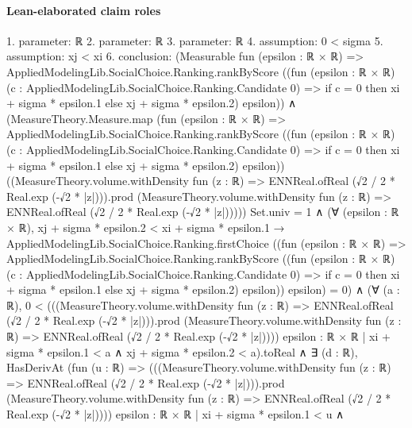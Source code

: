 \documentclass[10pt]{article}
\begin{document}
\paragraph{Lean-elaborated claim roles}\begin{ReviewVerbatim}
1. parameter: ℝ
2. parameter: ℝ
3. parameter: ℝ
4. assumption: 0 < sigma
5. assumption: xj < xi
6. conclusion: (Measurable fun (epsilon : ℝ × ℝ) =>
    AppliedModelingLib.SocialChoice.Ranking.rankByScore
      ((fun (epsilon : ℝ × ℝ) (c : AppliedModelingLib.SocialChoice.Ranking.Candidate 0) =>
          if c = 0 then xi + sigma * epsilon.1 else xj + sigma * epsilon.2)
        epsilon)) ∧
  (MeasureTheory.Measure.map
          (fun (epsilon : ℝ × ℝ) =>
            AppliedModelingLib.SocialChoice.Ranking.rankByScore
              ((fun (epsilon : ℝ × ℝ) (c : AppliedModelingLib.SocialChoice.Ranking.Candidate 0) =>
                  if c = 0 then xi + sigma * epsilon.1 else xj + sigma * epsilon.2)
                epsilon))
          ((MeasureTheory.volume.withDensity fun (z : ℝ) => ENNReal.ofReal (√2 / 2 * Real.exp (-√2 * |z|))).prod
            (MeasureTheory.volume.withDensity fun (z : ℝ) => ENNReal.ofReal (√2 / 2 * Real.exp (-√2 * |z|)))))
        Set.univ =
      1 ∧
    (∀ (epsilon : ℝ × ℝ),
        xj + sigma * epsilon.2 < xi + sigma * epsilon.1 →
          AppliedModelingLib.SocialChoice.Ranking.firstChoice
              ((fun (epsilon : ℝ × ℝ) =>
                  AppliedModelingLib.SocialChoice.Ranking.rankByScore
                    ((fun (epsilon : ℝ × ℝ) (c : AppliedModelingLib.SocialChoice.Ranking.Candidate 0) =>
                        if c = 0 then xi + sigma * epsilon.1 else xj + sigma * epsilon.2)
                      epsilon))
                epsilon) =
            0) ∧
      (∀ (a : ℝ),
          0 <
              (((MeasureTheory.volume.withDensity fun (z : ℝ) => ENNReal.ofReal (√2 / 2 * Real.exp (-√2 * |z|))).prod
                    (MeasureTheory.volume.withDensity fun (z : ℝ) => ENNReal.ofReal (√2 / 2 * Real.exp (-√2 * |z|))))
                  {epsilon : ℝ × ℝ | xi + sigma * epsilon.1 < a ∧ xj + sigma * epsilon.2 < a}).toReal ∧
            ∃ (d : ℝ),
              HasDerivAt
                  (fun (u : ℝ) =>
                    (((MeasureTheory.volume.withDensity fun (z : ℝ) =>
                                ENNReal.ofReal (√2 / 2 * Real.exp (-√2 * |z|))).prod
                            (MeasureTheory.volume.withDensity fun (z : ℝ) =>
                              ENNReal.ofReal (√2 / 2 * Real.exp (-√2 * |z|))))
                          {epsilon : ℝ × ℝ |
                            xi + sigma * epsilon.1 < u ∧
}
\end{ReviewVerbatim}
\end{document}

